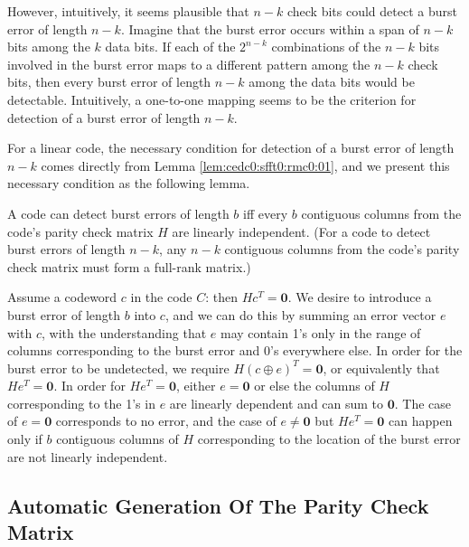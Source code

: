 However, intuitively, it seems plausible that $n-k$ check bits could detect a
burst error of length $n-k$.  Imagine that the burst error occurs within a span of
$n-k$ bits among the $k$ data bits.  If each of the $2^{n-k}$ combinations of the
$n-k$ bits involved in the burst error maps to a different pattern among the $n-k$
check bits, then every burst error of length $n-k$ among the data bits
would be detectable.  Intuitively, a one-to-one mapping seems to be the criterion
for detection of a burst error of length $n-k$.

For a linear code, the necessary condition for detection of a burst error
of length $n-k$ comes directly from Lemma
\ref{lem:cedc0:sfft0:rmc0:01}, and we present this necessary condition as the
following lemma.

\begin{vworklemmastatement}
\label{lem:cedc0:slco0:spcb0:01}
A code can detect burst errors of length $b$ iff every $b$ contiguous 
columns from the code's parity check matrix $H$ are linearly independent.
(For a code to detect burst errors of length $n-k$, any $n-k$ contiguous
columns from the code's parity check matrix must form a full-rank matrix.)
\end{vworklemmastatement}
\begin{vworklemmaproof}
Assume a codeword $c$ in the code $C$:  then $Hc^T=\mathbf{0}$.
We desire to introduce a burst error of length $b$ into $c$, and we can
do this by summing an error vector $e$ with $c$, with the understanding that
$e$ may contain 1's only in the range of columns corresponding to the burst
error and 0's everywhere else.  In order for the burst error to be undetected, we
require $H(c \oplus e)^T=\mathbf{0}$, or equivalently that 
$He^T=\mathbf{0}$.  In order for $He^T=\mathbf{0}$, either 
$e = \mathbf{0}$ or else the columns of $H$ corresponding to the 
1's in $e$ are linearly dependent and can sum to $\mathbf{0}$.
The case of $e=\mathbf{0}$ corresponds to no error, and the case
of $e \neq \mathbf{0}$ but $He^T=\mathbf{0}$ can happen only if
$b$ contiguous columns of $H$ corresponding to the location of the burst error
are not linearly independent.
\end{vworklemmaproof}
\vworklemmafooter{}


\subsection{Automatic Generation Of The Parity Check Matrix}
\label{cedc0:slco0:sagp0}



